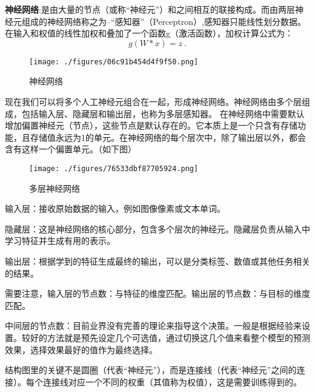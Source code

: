 \textbf{神经网络}:是由大量的节点（或称“神经元”）和之间相互的联接构成。而由两层神经元组成的神经网络称之为--“感知器”（Perceptron）,感知器只能线性划分数据。在输入和权值的线性加权和叠加了一个函数g（激活函数），加权计算公式为：
\begin{equation}
g(W * x) = z~.
\end{equation}
\begin{figure}[ht]
\centering
\texttt{[image: ./figures/06c91b454d4f9f50.png]}
\caption{神经网络} \label{fig_CNN1_4}
\end{figure}
现在我们可以将多个人工神经元组合在一起，形成神经网络。神经网络由多个层组成，包括输入层、隐藏层和输出层，也称为多层感知器。
在神经网络中需要默认增加偏置神经元（节点），这些节点是默认存在的。它本质上是一个只含有存储功能，且存储值永远为1的单元。在神经网络的每个层次中，除了输出层以外，都会含有这样一个偏置单元。（如下图）\begin{figure}[ht]
\centering
\texttt{[image: ./figures/76533dbf87705924.png]}
\caption{多层神经网络} \label{fig_CNN1_5}
\end{figure}
输入层：接收原始数据的输入，例如图像像素或文本单词。

隐藏层：这是神经网络的核心部分，包含多个层次的神经元。隐藏层负责从输入中学习特征并生成有用的表示。

输出层：根据学到的特征生成最终的输出，可以是分类标签、数值或其他任务相关的结果。

需要注意，输入层的节点数：与特征的维度匹配。输出层的节点数：与目标的维度匹配。

中间层的节点数：目前业界没有完善的理论来指导这个决策。一般是根据经验来设置。较好的方法就是预先设定几个可选值，通过切换这几个值来看整个模型的预测效果，选择效果最好的值作为最终选择。

结构图里的关键不是圆圈（代表“神经元”），而是连接线（代表“神经元”之间的连接）。每个连接线对应一个不同的权重（其值称为权值），这是需要训练得到的。
